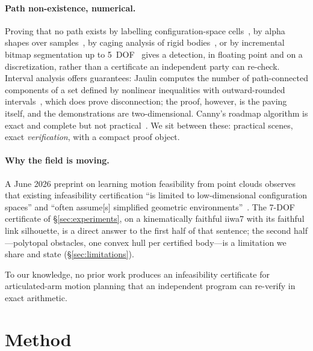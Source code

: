 \documentclass[10pt,twocolumn,letterpaper]{article}
\begin{document}
\paragraph{Path non-existence, numerical.} Proving that no path exists by labelling configuration-space cells~\cite{zhang2008}, by alpha shapes over samples~\cite{mccarthy2012}, by caging analysis of rigid bodies~\cite{varava2021}, or by incremental bitmap segmentation up to 5~DOF~\cite{thomas2025} gives a detection, in floating point and on a discretization, rather than a certificate an independent party can re-check. Interval analysis offers guarantees: Jaulin computes the number of path-connected components of a set defined by nonlinear inequalities with outward-rounded intervals~\cite{jaulin2001}, which does prove disconnection; the proof, however, is the paving itself, and the demonstrations are two-dimensional. Canny's roadmap algorithm is exact and complete but not practical~\cite{canny1988}. We sit between these: practical scenes, exact \emph{verification}, with a compact proof object.

\paragraph{Why the field is moving.} A June 2026 preprint on learning motion feasibility from point clouds observes that existing infeasibility certification ``is limited to low-dimensional configuration spaces'' and ``often assume[s] simplified geometric environments''~\cite{feasibility2026}. The 7-DOF certificate of \S\ref{sec:experiments}, on a kinematically faithful iiwa7 with its faithful link silhouette, is a direct answer to the first half of that sentence; the second half---polytopal obstacles, one convex hull per certified body---is a limitation we share and state (\S\ref{sec:limitations}).

To our knowledge, no prior work produces an infeasibility certificate for articulated-arm motion planning that an independent program can re-verify in exact arithmetic.

\section{Method}\label{sec:method}
\end{document}
